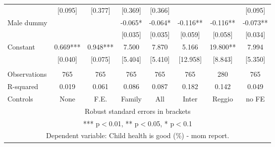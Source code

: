\begin{tabular}{lccccccc}
 & [0.095] & [0.377] & [0.369] & [0.366] &  &  & [0.095] \\
Male dummy &  &  & -0.065* & -0.064* & -0.116** & -0.116** & -0.073** \\
 &  &  & [0.035] & [0.035] & [0.059] & [0.058] & [0.034] \\
Constant & 0.669*** & 0.948*** & 7.500 & 7.870 & 5.166 & 19.800** & 7.994 \\
 & [0.040] & [0.075] & [5.404] & [5.410] & [12.958] & [8.843] & [5.350] \\
 &  &  &  &  &  &  &  \\
Observations & 765 & 765 & 765 & 765 & 765 & 280 & 765 \\
R-squared & 0.019 & 0.061 & 0.086 & 0.087 & 0.182 & 0.142 & 0.049 \\
 Controls & None & F.E. & Family & All & Inter & Reggio & no FE \\ \hline
\multicolumn{8}{c}{ Robust standard errors in brackets} \\
\multicolumn{8}{c}{ *** p$<$0.01, ** p$<$0.05, * p$<$0.1} \\
\multicolumn{8}{c}{ Dependent variable: Child health is good (\%) - mom report.} \\
\end{tabular}

